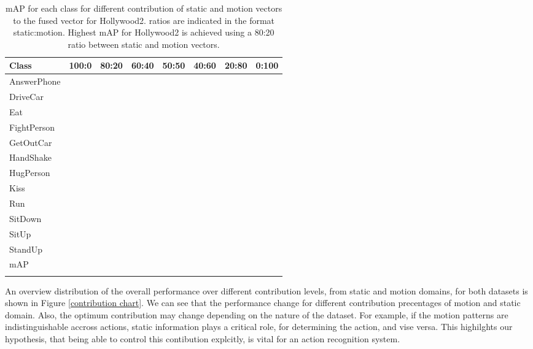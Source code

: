 \begin{table*}[]
\centering

\label{my-label}
\begin{tabular}{|l||l|l|l|l|l|l|l|}
\hline
Class           & 100:0 & 80:20 & 60:40 & 50:50 & 40:60 & 20:80 & 0:100 \\ \hline \hline
AnswerPhone       &     &     &     &     &   &&  \\ 
DriveCar           &     &     &     &     &   &&  \\ 
Eat           &     &     &     &     &    && \\ 
FightPerson         &     &     &     &     &  &&   \\ 
GetOutCar       &     &     &     &     &    && \\ 
HandShake        &     &     &     &     &   &&  \\ 
HugPerson       &     &     &     &     &   &&  \\ 
Kiss        &     &     &     &     &   &&  \\ 
Run        &     &     &     &     &  &&   \\ 
SitDown           &     &     &     &     &  &&   \\ 
SitUp           &     &     &     &     &   &&  \\ 
StandUp           &     &     &     &     &   &&  \\ \hline
mAP          &     &     &     &     &    && \\ \hline
\label{tbl:rho hollywood2}
\end{tabular}
\caption{mAP for each class for different contribution of static and motion vectors to the fused vector for Hollywood2. ratios are indicated in the 
format static:motion. Highest mAP for Hollywood2 is achieved using a 
80:20 ratio between static and motion vectors.}
\end{table*}

An overview distribution of the overall performance over different contribution levels, from static and motion domains, for both datasets is shown in Figure \ref{contribution chart}.
We can see that the performance change for different contribution precentages of motion and static domain. Also, the optimum contribution may change
depending on the nature of the dataset. For example, if the motion patterns are indistinguishable accross actions, static information plays 
a critical role, for determining the action, and vise versa. This highilghts
our hypothesis, that being able to control this contibution explcitly, is vital for an action recognition system. 





